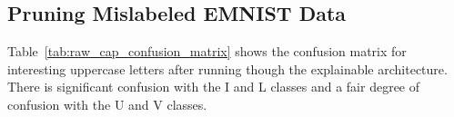 \subsection{Pruning Mislabeled EMNIST Data}

Table~\ref{tab:raw_cap_confusion_matrix} shows the confusion matrix for interesting
uppercase letters after running though the explainable architecture. There is
significant confusion with the I and L classes and a fair degree of confusion
with the U and V classes.




